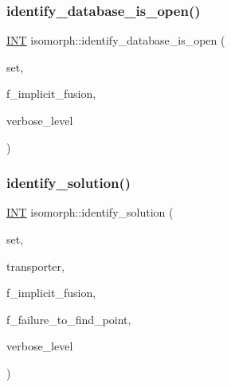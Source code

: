 \mbox{\label{classisomorph_a4a5d04d07ac8c2a994fa174f156dea73}} 
\subsubsection{\texorpdfstring{identify\+\_\+database\+\_\+is\+\_\+open()}{identify\_database\_is\_open()}}
{\footnotesize\ttfamily \mbox{\hyperlink{galois_8h_a09fddde158a3a20bd2dcadb609de11dc}{I\+NT}} isomorph\+::identify\+\_\+database\+\_\+is\+\_\+open (\begin{DoxyParamCaption}\item[{\mbox{\hyperlink{galois_8h_a09fddde158a3a20bd2dcadb609de11dc}{I\+NT}} $\ast$}]{set,  }\item[{\mbox{\hyperlink{galois_8h_a09fddde158a3a20bd2dcadb609de11dc}{I\+NT}}}]{f\+\_\+implicit\+\_\+fusion,  }\item[{\mbox{\hyperlink{galois_8h_a09fddde158a3a20bd2dcadb609de11dc}{I\+NT}}}]{verbose\+\_\+level }\end{DoxyParamCaption})}

\mbox{\label{classisomorph_abc63d2e561a6209e32c47d8486c9a67e}} 
\subsubsection{\texorpdfstring{identify\+\_\+solution()}{identify\_solution()}}
{\footnotesize\ttfamily \mbox{\hyperlink{galois_8h_a09fddde158a3a20bd2dcadb609de11dc}{I\+NT}} isomorph\+::identify\+\_\+solution (\begin{DoxyParamCaption}\item[{\mbox{\hyperlink{galois_8h_a09fddde158a3a20bd2dcadb609de11dc}{I\+NT}} $\ast$}]{set,  }\item[{\mbox{\hyperlink{galois_8h_a09fddde158a3a20bd2dcadb609de11dc}{I\+NT}} $\ast$}]{transporter,  }\item[{\mbox{\hyperlink{galois_8h_a09fddde158a3a20bd2dcadb609de11dc}{I\+NT}}}]{f\+\_\+implicit\+\_\+fusion,  }\item[{\mbox{\hyperlink{galois_8h_a09fddde158a3a20bd2dcadb609de11dc}{I\+NT}} \&}]{f\+\_\+failure\+\_\+to\+\_\+find\+\_\+point,  }\item[{\mbox{\hyperlink{galois_8h_a09fddde158a3a20bd2dcadb609de11dc}{I\+NT}}}]{verbose\+\_\+level }\end{DoxyParamCaption})}

